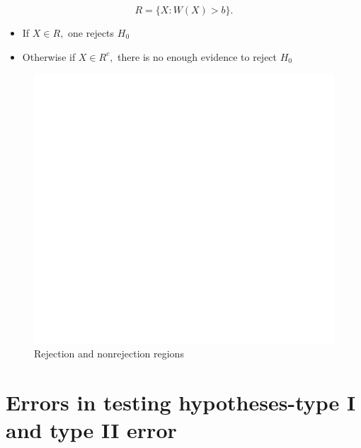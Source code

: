 \documentclass[]{book}
\providecommand{\tightlist}{%
  \setlength{\itemsep}{0pt}\setlength{\parskip}{0pt}}
\begin{document}
\[R = \{X:W(X)>b\}.\]

\begin{itemize}
\tightlist
\item
  If \(X\in R,\) one rejects \(H_0\)
\item
  Otherwise if \(X\in R^c,\) there is no enough evidence to reject \(H_0\)
\end{itemize}

\begin{figure}[h]

{\centering \includegraphics[width=1\linewidth]{figure/Ch3box4-1} 

}

\caption{Rejection and nonrejection regions}\label{fig:Ch3box4}
\end{figure}

\newpage

\hypertarget{errors-in-testing-hypotheses-type-i-and-type-ii-error}{%
\section{Errors in testing hypotheses-type I and type II error}\label{errors-in-testing-hypotheses-type-i-and-type-ii-error}}
\end{document}
